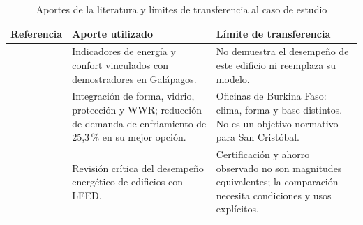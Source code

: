 \begin{table}[htbp]\centering
\caption{Aportes de la literatura y límites de transferencia al caso de estudio}
{\small\singlespacing\renewcommand{\arraystretch}{1.2}
\begin{tabular}{p{3.4cm}p{4.8cm}p{4.6cm}}\toprule
Referencia & Aporte utilizado & Límite de transferencia \\ \midrule
\textcite{torres-barriusoSustainableBuildingStandards2025} & Indicadores de energía y confort vinculados con demostradores en Galápagos. & No demuestra el desempeño de este edificio ni reemplaza su modelo. \\
\textcite{zoureImplementingNaturalVentilation2023a} & Integración de forma, vidrio, protección y WWR; reducción de demanda de enfriamiento de 25,3\,\% en su mejor opción. & Oficinas de Burkina Faso: clima, forma y base distintos. No es un objetivo normativo para San Cristóbal. \\
\textcite{ribeiroLEEDCertificationBuilding} & Revisión crítica del desempeño energético de edificios con LEED. & Certificación y ahorro observado no son magnitudes equivalentes; la comparación necesita condiciones y usos explícitos. \\
\bottomrule\end{tabular}}
\end{table}
